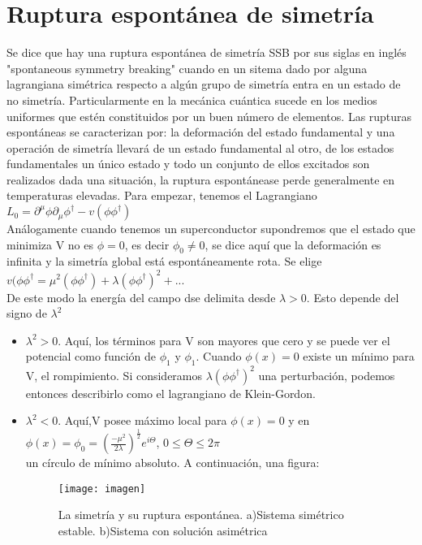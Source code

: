 \documentclass[a4paper,12pt,twoside]{book}
\begin{document}
\section{Ruptura espontánea de simetría}
Se dice que hay una ruptura espontánea de simetría SSB por sus siglas en inglés "spontaneous symmetry breaking" cuando en un sitema dado por alguna lagrangiana simétrica respecto a algún grupo de simetría entra en un estado de no simetría. Particularmente en la mecánica cuántica sucede en los medios uniformes que estén constituidos por un buen número de elementos. Las rupturas espontáneas se caracterizan por: la deformación del estado fundamental y una operación de simetría llevará de un estado fundamental al otro, de los estados fundamentales un único estado y todo un conjunto de ellos excitados son realizados dada una situación, la ruptura espontánease perde generalmente en temperaturas elevadas.
Para empezar, tenemos el Lagrangiano \\
$L_{0}=\partial^{\mu}\phi\partial_{\mu}\phi^{\dagger}-v(\phi\phi^{\dagger})$ \\
Análogamente cuando tenemos un superconductor  supondremos que el estado que minimiza V no es $\phi=0$, es decir $\phi_{0}\neq 0$, se dice aquí que la deformación es infinita y la simetría global está espontáneamente rota. Se elige \\
$v(\phi\phi^{\dagger}=\mu^{2}(\phi\phi^{\dagger})+\lambda(\phi\phi^{\dagger})^{2}+...$ \\
De este modo la energía del campo dse delimita desde $\lambda>0$. Esto depende del signo de $\lambda^{2}$
\begin{itemize}
\item $\lambda^{2}>0$. Aquí, los términos para V son mayores que cero y se puede ver el potencial como función de $\phi_{1}$ y $\phi_{1}$. Cuando $\phi(x)=0$ existe un mínimo para V, el rompimiento. Si consideramos $\lambda(\phi\phi^{\dagger})^{2}$ una perturbación, podemos entonces describirlo como el lagrangiano de Klein-Gordon.
\item $\lambda^{2}<0$. Aquí,V posee máximo local para $\phi(x)=0$ y en\\
$\phi(x)=\phi_{0}=(\frac{-\mu^{2}}{2\lambda})^{\frac{1}{2}}e^{i\Theta}$, $0\leq\Theta\leq2\pi$\\
un círculo de mínimo absoluto.
A continuación, una figura:
\begin{figure}[h]
\begin{center}
\texttt{[image: imagen]}
\caption{La simetría y su ruptura espontánea. a)Sistema simétrico estable. b)Sistema con solución asimétrica}
\label{fig:a}
\end{center}
\end{figure}


\end{itemize}
\end{document}
